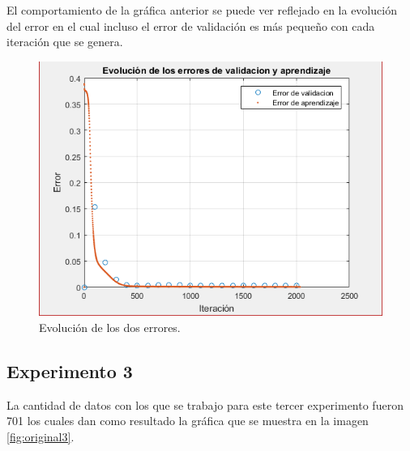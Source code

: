 El comportamiento de la gráfica anterior se puede ver reflejado en la evolución del error en el cual incluso el error de validación es más pequeño con cada iteración que se genera.
\begin{figure}[H]
    \begin{center}
        \includegraphics[width=16cm]{2/error.png}
        \caption{Evolución de los dos errores.}
        \label{fig:error2}
    \end{center}
\end{figure}

\newpage

\subsection{Experimento 3}
La cantidad de datos con los que se trabajo para este tercer experimento fueron 701 los cuales dan como resultado la gráfica que se muestra en la imagen \ref{fig:original3}.

